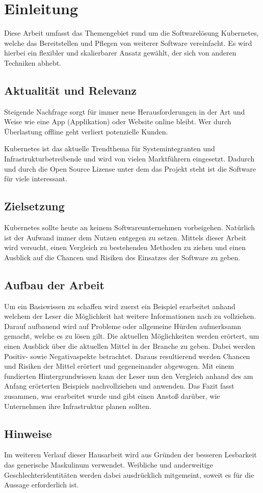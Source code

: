 \section{Einleitung}
Diese Arbeit umfasst das Themengebiet rund um die Softwarelösung Kubernetes, welche das Bereitstellen und Pflegen von weiterer Software vereinfacht. 
Es wird hierbei ein flexibler und skalierbarer Ansatz gewählt, der sich von anderen Techniken abhebt.

\subsection{Aktualität und Relevanz}
Steigende Nachfrage sorgt für immer neue Herausforderungen in der Art und Weise wie eine App (Applikation) oder Website online bleibt. Wer durch Überlastung offline geht verliert potenzielle Kunden.

Kubernetes ist das aktuelle Trendthema für Systemintegranten und Infrastrukturbetreibende und wird von vielen Marktführern eingesetzt. Dadurch und durch die Open Source Lizense unter dem das Projekt steht
ist die Software für viele interessant.

\subsection{Zielsetzung}
Kubernetes sollte heute an keinem Softwareunternehmen vorbeigehen. Natürlich ist der Aufwand immer dem Nutzen entgegen zu setzen. Mittels dieser Arbeit wird versucht, einen Vergleich zu 
bestehenden Methoden zu ziehen und einen Ausblick auf die Chancen und Risiken des Einsatzes der Software zu geben.

\subsection{Aufbau der Arbeit}
Um ein Basiswissen zu schaffen wird zuerst ein Beispiel erarbeitet anhand welchem der Leser die Möglichkeit hat weitere Informationen nach zu vollziehen.
Darauf aufbauend wird auf Probleme oder allgemeine Hürden aufmerksamn gemacht, welche es zu lösen gilt. Die aktuellen Möglichkeiten werden erörtert, um einen Ausblick über 
die aktuellen Mittel in der Branche zu geben. Dabei werden Positiv- sowie Negativaspekte betrachtet. Daraus resultierend werden Chancen und Risiken der Mittel erörtert und gegeneinander abgewogen.
Mit einem fundierten Hintergrundwissen kann der Leser nun den Vergleich anhand des am Anfang erörterten Beispiels nachvollziehen und anwenden.
Das Fazit fasst zusammen, was erarbeitet wurde und gibt einen Anstoß darüber, wie Unternehmen ihre Infrastruktur planen sollten.

\subsection{Hinweise}
Im weiteren Verlauf dieser Hausarbeit wird aus Gründen der besseren Lesbarkeit das generische Maskulinum verwendet. Weibliche und anderweitige Geschlechteridentitäten werden dabei ausdrücklich mitgemeint, soweit es für die Aussage erforderlich ist.